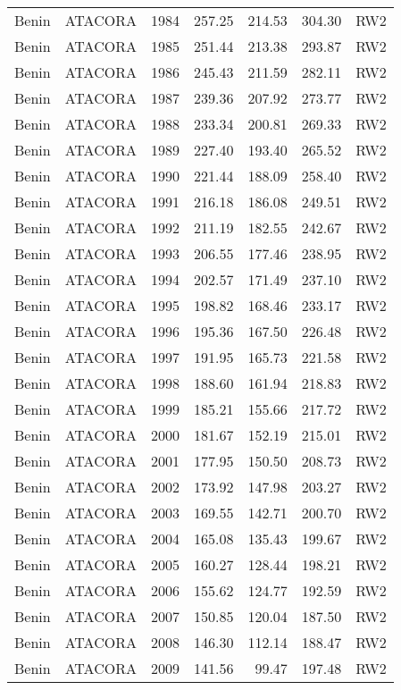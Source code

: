 \begin{longtable}{lllrrrl}
  Benin & ATACORA & 1984 & 257.25 & 214.53 & 304.30 & RW2 \\ 
  Benin & ATACORA & 1985 & 251.44 & 213.38 & 293.87 & RW2 \\ 
  Benin & ATACORA & 1986 & 245.43 & 211.59 & 282.11 & RW2 \\ 
  Benin & ATACORA & 1987 & 239.36 & 207.92 & 273.77 & RW2 \\ 
  Benin & ATACORA & 1988 & 233.34 & 200.81 & 269.33 & RW2 \\ 
  Benin & ATACORA & 1989 & 227.40 & 193.40 & 265.52 & RW2 \\ 
  Benin & ATACORA & 1990 & 221.44 & 188.09 & 258.40 & RW2 \\ 
  Benin & ATACORA & 1991 & 216.18 & 186.08 & 249.51 & RW2 \\ 
  Benin & ATACORA & 1992 & 211.19 & 182.55 & 242.67 & RW2 \\ 
  Benin & ATACORA & 1993 & 206.55 & 177.46 & 238.95 & RW2 \\ 
  Benin & ATACORA & 1994 & 202.57 & 171.49 & 237.10 & RW2 \\ 
  Benin & ATACORA & 1995 & 198.82 & 168.46 & 233.17 & RW2 \\ 
  Benin & ATACORA & 1996 & 195.36 & 167.50 & 226.48 & RW2 \\ 
  Benin & ATACORA & 1997 & 191.95 & 165.73 & 221.58 & RW2 \\ 
  Benin & ATACORA & 1998 & 188.60 & 161.94 & 218.83 & RW2 \\ 
  Benin & ATACORA & 1999 & 185.21 & 155.66 & 217.72 & RW2 \\ 
  Benin & ATACORA & 2000 & 181.67 & 152.19 & 215.01 & RW2 \\ 
  Benin & ATACORA & 2001 & 177.95 & 150.50 & 208.73 & RW2 \\ 
  Benin & ATACORA & 2002 & 173.92 & 147.98 & 203.27 & RW2 \\ 
  Benin & ATACORA & 2003 & 169.55 & 142.71 & 200.70 & RW2 \\ 
  Benin & ATACORA & 2004 & 165.08 & 135.43 & 199.67 & RW2 \\ 
  Benin & ATACORA & 2005 & 160.27 & 128.44 & 198.21 & RW2 \\ 
  Benin & ATACORA & 2006 & 155.62 & 124.77 & 192.59 & RW2 \\ 
  Benin & ATACORA & 2007 & 150.85 & 120.04 & 187.50 & RW2 \\ 
  Benin & ATACORA & 2008 & 146.30 & 112.14 & 188.47 & RW2 \\ 
  Benin & ATACORA & 2009 & 141.56 & 99.47 & 197.48 & RW2 \\ 

\end{longtable}
